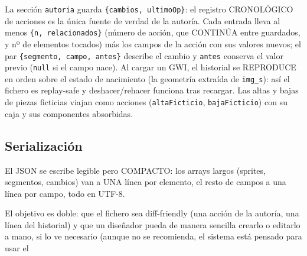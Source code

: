 La sección \texttt{autoria} guarda \texttt{\{cambios, ultimoOp\}}: el
registro CRONOLÓGICO de acciones es la única fuente de verdad de la
autoría. Cada entrada lleva al menos \texttt{\{n, relacionados\}} (número de
acción, que CONTINÚA entre guardados, y nº de elementos tocados) más los
campos de la acción con sus valores nuevos; el par
\texttt{\{segmento, campo, antes\}} describe el cambio y \texttt{antes}
conserva el valor previo (\texttt{null} si el campo nace). Al cargar un GWI,
el historial se REPRODUCE en orden sobre el estado de nacimiento (la
geometría extraída de \texttt{img\_s}): así el fichero es replay-safe y
deshacer/rehacer funciona tras recargar. Las altas y bajas de piezas
ficticias viajan como acciones (\texttt{altaFicticio}, \texttt{bajaFicticio})
con su caja y sus componentes absorbidas.

\subsection{Serialización}
\label{sec:A02Serializacion}

El JSON se escribe legible pero COMPACTO: los arrays largos (sprites,
segmentos, cambios) van a UNA línea por elemento, el resto de campos a una
línea por campo, todo en UTF-8. 

El objetivo es doble: que el fichero sea
diff-friendly (una acción de la autoría, una línea del historial) y que un
diseñador pueda de manera sencilla crearlo o editarlo a mano, si lo ve 
necesario (aunque no se recomienda, el sistema está pensado para usar el 
